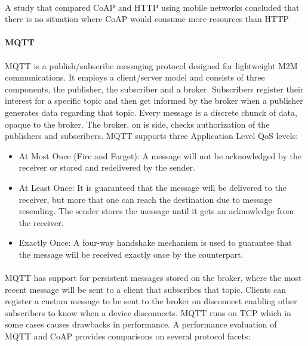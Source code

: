\paragraph{}
A study that compared \ac{CoAP} and \ac{HTTP} using mobile networks concluded that there is no situation where \ac{CoAP} would consume more resources than \ac{HTTP} \cite{Savolainen2014}

\paragraph{\textbf{\ac{MQTT}}}
\paragraph{}
	\ac{MQTT} is a publish/subscribe messaging protocol designed for lightweight \ac{M2M} communications. It employs a client/server model and consists of three components, the publisher, the subscriber and a broker.
Subscribers register their interest for a specific topic and then get informed by the broker when a publisher generates data regarding that topic. Every message is a discrete chunck of data, opaque to the broker. The broker, on is side, checks authorization of the publishers and subscribers. \ac{MQTT} supports three Application Level \ac{QoS} levels:

\begin{itemize}
	\item At Most Once (Fire and Forget): A message will not be acknowledged by the receiver or stored and redelivered by the sender.\\
	\item At Least Once: It is guaranteed that the message will be delivered to the receiver, but more that one can reach the destination due to message resending. The sender stores the message until it gets an acknowledge from the receiver.\\
	\item Exactly Once: A four-way handshake mechanism is used to guarantee that the message will be received exactly once by the counterpart.
\end{itemize}

\paragraph{}
\ac{MQTT} has support for persistent messages stored on the broker, where the most recent message will be sent to a client that subscribes that topic. Clients can register a custom message to be sent to the broker on disconnect enabling other subscribers to know when a device disconnects. \ac{MQTT} runs on \ac{TCP} which in some cases causes drawbacks in performance. A performance evaluation of \ac{MQTT} and \ac{CoAP} \cite{Ma2014} provides comparisons on several protocol facets:

